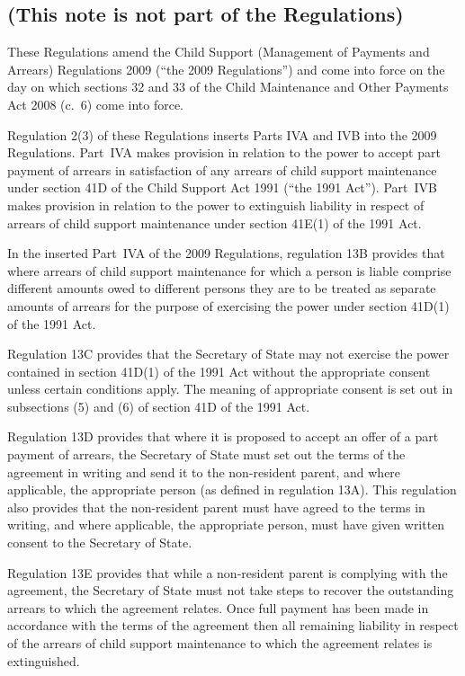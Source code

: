 \documentclass[12pt,a4paper]{article}
\begin{document}
\renewcommand\parthead{— Explanatory Note}

\subsection*{(This note is not part of the Regulations)}

These Regulations amend the Child Support (Management of Payments and Arrears) Regulations 2009 (“the 2009 Regulations”) and come into force on the day on which sections 32 and 33 of the Child Maintenance and Other Payments Act 2008 (c.~6) come into force.

Regulation 2(3) of these Regulations inserts Parts IVA and IVB into the 2009 Regulations. Part~IVA makes provision in relation to the power to accept part payment of arrears in satisfaction of any arrears of child support maintenance under section 41D of the Child Support Act 1991 (“the 1991 Act”). Part~IVB makes provision in relation to the power to extinguish liability in respect of arrears of child support maintenance under section 41E(1) of the 1991 Act.

In the inserted Part~IVA of the 2009 Regulations, regulation 13B provides that where arrears of child support maintenance for which a person is liable comprise different amounts owed to different persons they are to be treated as separate amounts of arrears for the purpose of exercising the power under section 41D(1) of the 1991 Act.

Regulation 13C provides that the Secretary of State may not exercise the power contained in section 41D(1) of the 1991 Act without the appropriate consent unless certain conditions apply. The meaning of appropriate consent is set out in subsections (5) and (6) of section 41D of the 1991 Act.

Regulation 13D provides that where it is proposed to accept an offer of a part payment of arrears, the Secretary of State must set out the terms of the agreement in writing and send it to the non-resident parent, and where applicable, the appropriate person (as defined in regulation 13A). This regulation also provides that the non-resident parent must have agreed to the terms in writing, and where applicable, the appropriate person, must have given written consent to the Secretary of State.

Regulation 13E provides that while a non-resident parent is complying with the agreement, the Secretary of State must not take steps to recover the outstanding arrears to which the agreement relates. Once full payment has been made in accordance with the terms of the agreement then all remaining liability in respect of the arrears of child support maintenance to which the agreement relates is extinguished.
\end{document}
